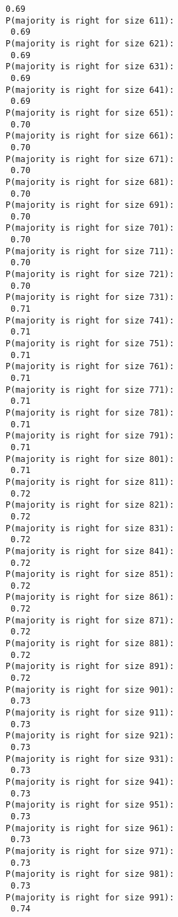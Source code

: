 \documentclass[11pt]{article}
\begin{document}
\begin{Verbatim}[commandchars=\\\{\}]
 0.69
P(majority is right for size 611):
 0.69
P(majority is right for size 621):
 0.69
P(majority is right for size 631):
 0.69
P(majority is right for size 641):
 0.69
P(majority is right for size 651):
 0.70
P(majority is right for size 661):
 0.70
P(majority is right for size 671):
 0.70
P(majority is right for size 681):
 0.70
P(majority is right for size 691):
 0.70
P(majority is right for size 701):
 0.70
P(majority is right for size 711):
 0.70
P(majority is right for size 721):
 0.70
P(majority is right for size 731):
 0.71
P(majority is right for size 741):
 0.71
P(majority is right for size 751):
 0.71
P(majority is right for size 761):
 0.71
P(majority is right for size 771):
 0.71
P(majority is right for size 781):
 0.71
P(majority is right for size 791):
 0.71
P(majority is right for size 801):
 0.71
P(majority is right for size 811):
 0.72
P(majority is right for size 821):
 0.72
P(majority is right for size 831):
 0.72
P(majority is right for size 841):
 0.72
P(majority is right for size 851):
 0.72
P(majority is right for size 861):
 0.72
P(majority is right for size 871):
 0.72
P(majority is right for size 881):
 0.72
P(majority is right for size 891):
 0.72
P(majority is right for size 901):
 0.73
P(majority is right for size 911):
 0.73
P(majority is right for size 921):
 0.73
P(majority is right for size 931):
 0.73
P(majority is right for size 941):
 0.73
P(majority is right for size 951):
 0.73
P(majority is right for size 961):
 0.73
P(majority is right for size 971):
 0.73
P(majority is right for size 981):
 0.73
P(majority is right for size 991):
 0.74

    \end{Verbatim}
\end{document}
